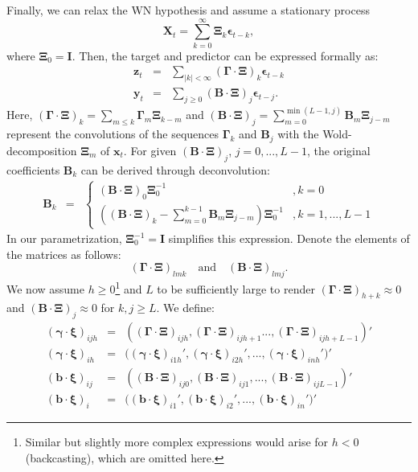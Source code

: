 \documentclass[11pt,a4paper]{article}
\begin{document}
Finally, we can relax the WN hypothesis and assume a stationary process 
\begin{equation}\label{x_m_st}
\mathbf{X}_t = \sum_{k=0}^\infty \boldsymbol{\Xi}_k \boldsymbol{\epsilon}_{t-k},
\end{equation}
where $\boldsymbol{\Xi}_0 = \mathbf{I}$. Then, the target and predictor can be expressed formally as:
\begin{eqnarray*}
\mathbf{z}_t&=&\sum_{|k|<\infty}(\boldsymbol{\Gamma}\cdot\boldsymbol{\Xi})_k \boldsymbol{\epsilon}_{t-k}\\
\mathbf{y}_t&=&\sum_{j\geq 0} (\mathbf{B}\cdot\boldsymbol{\Xi})_j\boldsymbol{\epsilon}_{t-j}.
\end{eqnarray*} 
Here, $(\boldsymbol{\Gamma}\cdot\boldsymbol{\Xi})_k =\sum_{m\leq k}\boldsymbol{\Gamma}_m\boldsymbol{\Xi}_{k-m}$ and $(\mathbf{B}\cdot\boldsymbol{\Xi})_j=\sum_{m=0}^{\min(L-1,j)}\mathbf{B}_m \boldsymbol{\Xi}_{j-m} $ represent the convolutions of the sequences $\boldsymbol{\Gamma}_k$ and $\mathbf{B}_j$ with the Wold-decomposition $\boldsymbol{\Xi}_m$ of $\mathbf{x}_t$. For  given $(\mathbf{B}\cdot\boldsymbol{\Xi})_j$, $j=0,...,L-1$, the original coefficients $\mathbf{B}_{k}$ can be derived through deconvolution:
\begin{eqnarray}\label{con_inv}
\mathbf{B}_{k}&=&\left\{\begin{array}{cc}(\mathbf{B}\cdot\boldsymbol{\Xi})_{0}\boldsymbol{\Xi}_0^{-1}&,k=0\\
\left(  (\mathbf{B}\cdot\boldsymbol{\Xi})_{k}-\sum_{m=0}^{k-1}\mathbf{B}_m \boldsymbol{\Xi}_{j-m}\right)\boldsymbol{\Xi}_0^{-1}&,k=1,...,L-1
\end{array}\right.
\end{eqnarray}
In our parametrization, $\boldsymbol{\Xi}_0^{-1} = \mathbf{I}$ simplifies this expression. Denote the elements of the matrices as follows:
\[
(\boldsymbol{\Gamma}\cdot\boldsymbol{\Xi})_{lmk}
 \quad \text{and} \quad (\mathbf{B}\cdot\boldsymbol{\Xi})_{lmj}.
 \] 
We now assume $h\geq 0$\footnote{Similar but slightly more complex expressions would arise for $h < 0$ (backcasting), which are omitted here.} and $L$ to be sufficiently large to render $(\boldsymbol{\Gamma} \cdot \boldsymbol{\Xi})_{h+k} \approx 0$ and $(\mathbf{B} \cdot \boldsymbol{\Xi})_j \approx 0$ for $k,j \geq L$. We define:
\begin{eqnarray*}
(\boldsymbol{\gamma}\cdot\boldsymbol{\xi})_{ijh}&=&\left((\boldsymbol{\Gamma}\cdot\boldsymbol{\Xi})_{ijh},(\boldsymbol{\Gamma}\cdot\boldsymbol{\Xi})_{ ijh+1}...,(\boldsymbol{\Gamma}\cdot\boldsymbol{\Xi})_{ijh+L-1}\right)'\\
(\boldsymbol{\gamma}\cdot\boldsymbol{\xi})_{ih}&=&\Big((\boldsymbol{\gamma}\cdot\boldsymbol{\xi})_{i1h}',(\boldsymbol{\gamma}\cdot\boldsymbol{\xi})_{i2h}',...,(\boldsymbol{\gamma}\cdot\boldsymbol{\xi})_{inh}'\Big)'\\
(\mathbf{b}\cdot\boldsymbol{\xi})_{ij}&=&\left((\mathbf{B}\cdot\boldsymbol{\Xi})_{ ij0},(\mathbf{B}\cdot\boldsymbol{\Xi})_{ij1},...,(\mathbf{B}\cdot\boldsymbol{\Xi})_{ijL-1}\right)'\\
(\mathbf{b}\cdot\boldsymbol{\xi})_{i}&=&\Big((\mathbf{b}\cdot\boldsymbol{\xi})_{i1}',(\mathbf{b}\cdot\boldsymbol{\xi})_{i2}',...,(\mathbf{b}\cdot\boldsymbol{\xi})_{in}'\Big)'
\end{eqnarray*}
\end{document}

